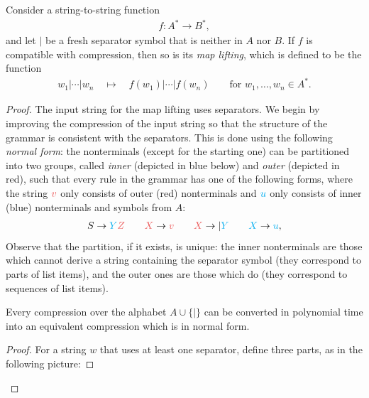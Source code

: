 \documentclass[a4paper,UKenglish,cleveref, autoref, thm-restate]{lipics-v2021}
\newcommand{\red}[1]{{\color{red}#1}}
\newcommand{\blue}[1]{{\color{cyan}#1}}
\newcommand{\set}[1]{\{#1\}}
\begin{document}
\begin{lemma}\label{lem:map}
    Consider a string-to-string function 
    \begin{align*}
    f : A^* \to B^*,
    \end{align*}
    and let $|$ be a fresh separator symbol that is neither in $A$ nor $B$. If $f$ is compatible with compression, then so is its \emph{map lifting}, which is defined to be the function
    \begin{align*}
    w_1 | \cdots | w_n  
    \quad \mapsto \quad 
    f(w_1) |  \cdots | f(w_n) 
    \qquad \text{for $w_1,\ldots,w_n \in A^*$}.
    \end{align*}
\end{lemma}
\begin{proof}
     The input  string for the map lifting uses separators.  We begin by improving the  compression of the input string  so that the structure of the grammar  is consistent with the separators. This is done using the following \emph{normal form}:  the nonterminals (except for the starting one) can be partitioned into two groups, called \emph{inner} (depicted in \blue{blue} below) and \emph{outer} (depicted in \red{red}), such that every rule in the grammar has one of the following forms, where the string $\red v$ only consists of outer (\red{red}) nonterminals and $\blue u$ only consists of 
 inner (\blue{blue}) nonterminals  and symbols from $A$:
    \begin{align*}
    S \to \blue Y \red Z \qquad
    \red X \to \red v \qquad
    \red X \to | \blue Y \qquad 
     \blue X \to \blue u,
    \end{align*}
   Observe that the partition, if it exists, is unique: the inner nonterminals are those which cannot derive a string containing the separator symbol (they correspond to parts of list items), and the outer ones are those which do (they correspond to sequences of list items).

    \begin{claim}
        Every compression over the alphabet $A \cup \set{
        |}$ can be converted in polynomial time into an equivalent compression which is in normal form.
        \end{claim}
    \begin{proof}
        For a string $w$ that uses at least one separator, define three parts, as in the following picture:
    
    \smallskip
        

\end{proof}
\end{proof}
\end{document}
